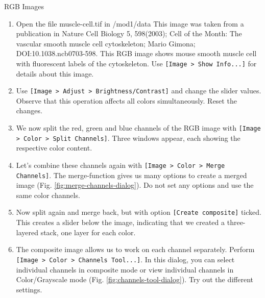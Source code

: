 \newpage
\begin{taskbox}{RGB Images}

\begin{enumerate}
	\item Open the file muscle-cell.tif in /mod1/data This image was taken from a publication in Nature Cell Biology 5, 598(2003); Cell of the Month: The vascular smooth muscle cell cytoskeleton; Mario Gimona; DOI:10.1038.ncb0703-598. This RGB image shows mouse smooth muscle cell with fluorescent labels of the cytoskeleton. Use \texttt{[Image > Show Info...]} for details about this image.
	\item Use \texttt{[Image > Adjust > Brightness/Contrast]} and change the slider values. Observe that this operation affects all colors simultaneously. Reset the changes.
	\item We now split the red, green and blue channels of the RGB image with \texttt{[Image > Color > Split Channels]}. Three windows appear, each showing the respective color content. 
	\item Let's combine these channels again with \texttt{[Image > Color > Merge Channels]}. The merge-function gives us many options to create a merged image (Fig. \ref{fig:merge-channels-dialog}). Do not set any options and use the same color channels.
	
	\begin{minipage}[t]{\linewidth}
		\begin{center}
		\medskip
		\label{fig:merge-channels-dialog}
		\end{center}
	\end{minipage}
	
	\item Now split again and merge back, but with option \texttt{[Create composite]} ticked. This creates a slider below the image, indicating that we created a three-layered stack, one layer for each color.  
	\item The composite image allows us to work on each channel separately. Perform \texttt{[Image > Color > Channels Tool...]}. In this dialog, you can select individual channels in composite mode or view individual channels in Color/Grayscale mode (Fig. \ref{fig:channels-tool-dialog}). Try out the different settings.
	

\end{enumerate}
\end{taskbox}
